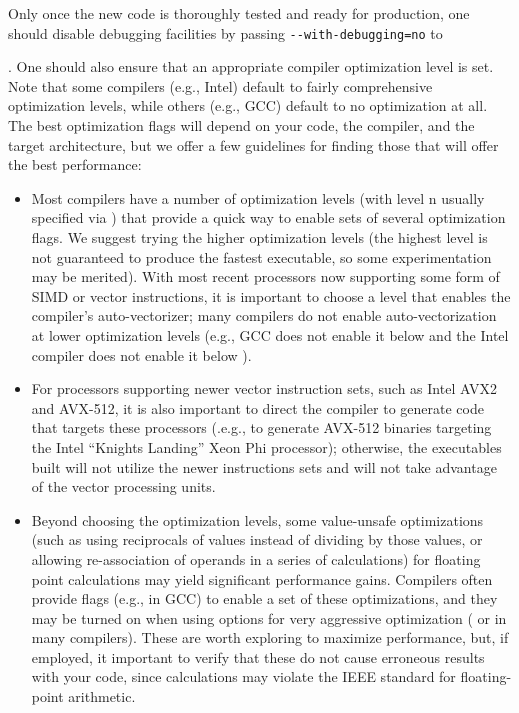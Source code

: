 {{Only once the new code is thoroughly tested and ready for production, one should disable debugging facilities by passing 
\lstinline|--with-debugging=no| to {.
One should also ensure that an appropriate compiler optimization level is set.
Note that some compilers (e.g., Intel) default to fairly comprehensive optimization levels, while others (e.g., GCC) default to no 
optimization at all.
The best optimization flags will depend on your code, the compiler, and the target architecture, but we offer a few guidelines for 
finding those that will offer the best performance:
\begin{itemize}
\item Most compilers have a number of optimization levels (with level n usually specified via ) that provide a quick way 
  to enable sets of several optimization flags. 
  We suggest trying the higher optimization levels (the highest level is not guaranteed to produce the fastest executable, 
  so some experimentation may be merited).
  With most recent processors now supporting some form of SIMD or vector instructions, it is important to choose a level that 
  enables the compiler's auto-vectorizer; many compilers do not enable auto-vectorization at lower optimization levels 
  (e.g., GCC does not enable it below  and the Intel compiler does not enable it below ).
\item For processors supporting newer vector instruction sets, such as Intel AVX2 and AVX-512, it is also important to direct the 
compiler to generate code that targets these processors (.e.g.,  to generate AVX-512 binaries targeting the 
Intel ``Knights Landing'' Xeon Phi processor); 
otherwise, the executables built will not utilize the newer instructions sets and will not take advantage of the vector processing units.
\item Beyond choosing the optimization levels, some value-unsafe optimizations (such as using reciprocals of values instead of dividing 
by those values, or allowing re-association of operands in a series of calculations) for floating point calculations may yield 
significant performance gains. Compilers often provide flags (e.g.,  in GCC) to enable a set of these optimizations, 
and they may be turned on when using options for very aggressive optimization ( or  in many compilers). 
These are worth exploring to maximize performance, but, if employed, it important to verify that these do not cause erroneous results 
with your code, since calculations may violate the IEEE standard for floating-point arithmetic.
\end{itemize}



}}}

